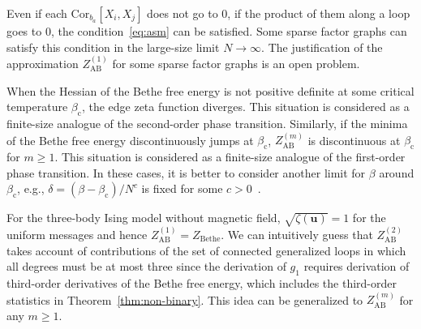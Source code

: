 \documentclass[a4paper,10pt,twoside,twocolumn,openany,final]{memoir}
\newcommand{\Cor}{\mathrm{Cor}}
\theoremstyle{plain}
\theoremstyle{definition}
\theoremstyle{remark}
\begin{document}
Even if each $\Cor_{b_a}[X_i, X_j]$ does not go to 0, if the product of them along a loop goes to 0,
the condition~\eqref{eq:asm} can be satisfied.
Some sparse factor graphs can satisfy this condition in the large-size limit $N\to\infty$.
The justification of the approximation $Z_{\mathrm{AB}}^{(1)}$ for some sparse factor graphs is an open problem.

When the Hessian of the Bethe free energy is not positive definite at some critical temperature $\beta_\mathrm{c}$,
the edge zeta function diverges.
This situation is considered as a finite-size analogue of the second-order phase transition.
Similarly, if the minima of the Bethe free energy discontinuously jumps at $\beta_\mathrm{c}$,
$Z_\mathrm{AB}^{(m)}$ is discontinuous at $\beta_\mathrm{c}$ for $m\ge 1$.
This situation is considered as a finite-size analogue of the first-order phase transition.
In these cases, it is better to consider another limit for $\beta$ around $\beta_\mathrm{c}$,
e.g., $\delta=(\beta-\beta_\mathrm{c})/N^c$ is fixed for some $c>0$~\cite{parisi1993critical}.

For the three-body Ising model without magnetic field, $\sqrt{\zeta(\bm{u})}=1$ for the uniform messages
and hence $Z_\mathrm{AB}^{(1)}=Z_\mathrm{Bethe}$.
We can intuitively guess that $Z_\mathrm{AB}^{(2)}$ takes account of contributions of
the set of connected generalized loops in which all degrees must be at most three
since the derivation of $g_1$ requires derivation of third-order derivatives of the Bethe free energy, which includes
the third-order statistics in Theorem~\ref{thm:non-binary}.
This idea can be generalized to $Z_{\mathrm{AB}}^{(m)}$ for any $m\ge 1$.





{\footnotesize

}
\thispagestyle{mysimple}
\end{document}
